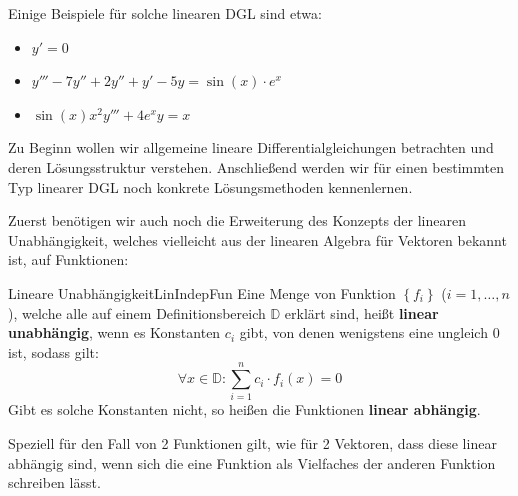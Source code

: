 Einige Beispiele für solche linearen DGL sind etwa:

\begin{itemize}
    \item $y'=0$
    \item $y'''-7y''+2y''+y'-5y=\sin(x)\cdot e^x$
    \item $\sin(x)x^2y'''+4e^x y = x$
\end{itemize}

Zu Beginn wollen wir allgemeine lineare Differentialgleichungen betrachten und deren Lösungsstruktur verstehen. Anschließend werden wir für einen bestimmten Typ linearer DGL noch konkrete Lösungsmethoden kennenlernen.

Zuerst benötigen wir auch noch die Erweiterung des Konzepts der linearen Unabhängigkeit, welches vielleicht aus der linearen Algebra für Vektoren bekannt ist, auf Funktionen:

\begin{definition}{Lineare Unabhängigkeit}{LinIndepFun}
    Eine Menge von Funktion $\left\lbrace f_i \right\rbrace$ ($i=1,\dots,n$), welche alle auf einem Definitionsbereich $\mathbb{D}$ erklärt sind, heißt \textbf{linear unabhängig}, wenn es Konstanten $c_i$ gibt, von denen wenigstens eine ungleich $0$ ist, sodass gilt:
    $$
        \forall x \in \mathbb{D}: \sum\limits_{i=1}^n c_i \cdot f_i(x) = 0
    $$
    Gibt es solche Konstanten nicht, so heißen die Funktionen \textbf{linear abhängig}.
\end{definition}

Speziell für den Fall von 2 Funktionen gilt, wie für 2 Vektoren, dass diese linear abhängig sind, wenn sich die eine Funktion als Vielfaches der anderen Funktion schreiben lässt.

